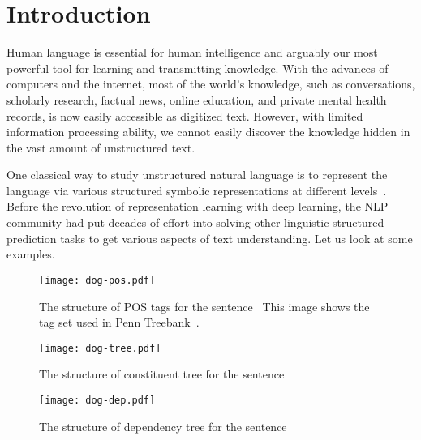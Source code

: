 
\chapter{Introduction}
\label{chap:intro}

Human language is essential for human intelligence and arguably our
most powerful tool for learning and transmitting knowledge. With the
advances of computers and the internet, most of the world's knowledge,
such as conversations, scholarly research, factual news, online
education, and private mental health records, is now easily accessible
as digitized text. However, with limited information processing
ability, we cannot easily discover the knowledge hidden in the vast
amount of unstructured text.

One classical way to study unstructured natural language is to
represent the language via various structured symbolic representations
at different levels~\citep{smith2011linguistic}. Before the revolution
of representation learning with deep learning, the NLP community had
put decades of effort into solving other linguistic structured
prediction tasks to get various aspects of text understanding. Let us
look at some examples.

\begin{figure}[!tbp]
\centering
\texttt{[image: dog-pos.pdf]}
\caption{\label{fig:intro:dog-pos}The structure of POS tags for the
  sentence \emph{}~This image shows the tag set used in Penn
  Treebank~\cite{marcus-etal-1994-penn}.}
\end{figure}

\begin{figure}[!tbp]
\centering
\texttt{[image: dog-tree.pdf]}
\caption{\label{fig:intro:dog-tree}The structure of constituent tree
  for the sentence~\emph{}}
\end{figure}

\begin{figure}[!tbp]
\centering
\texttt{[image: dog-dep.pdf]}
\caption{\label{fig:intro:dog-dep}The structure of dependency tree for
  the sentence \emph{}}
\end{figure}

